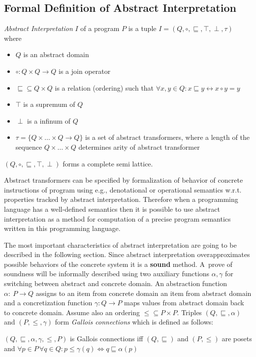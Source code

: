 \documentclass[a4paper, 12pt]{article}
\newcommand{\aord}[0]{\sqsubseteq}
\newcommand{\cord}[0]{\leq}
\newcommand{\adom}[0]{Q}
\newcommand{\aitem}[0]{q}
\newcommand{\asup}[0]{\top}
\newcommand{\ainf}[0]{\perp}
\newcommand{\cdom}[0]{P}
\newcommand{\citem}[0]{p}
\newcommand{\atrans}[0]{\tau}
\newcommand{\ajoin}[0]{\circ}
\newcommand{\afun}[0]{\alpha}
\newcommand{\cfun}[0]{\gamma}
\begin{document}
\subsection{Formal Definition of Abstract Interpretation}
\emph{Abstract Interpretation} $I$ of a program $P$ is a tuple
$I=(\adom, \ajoin, \aord, \asup, \ainf, \atrans)$ where
\begin{itemize}
	\item $\adom$ is an abstract domain
	\item $\ajoin: \adom \times \adom \rightarrow \adom$ is a join operator
	\item $\aord \subseteq \adom \times \adom$ is a relation (ordering) such that $\forall x,y \in \adom: x \aord y \leftrightarrow x \ajoin y = y$
	\item $\asup$ is a supremum of $\adom$
	\item $\ainf$ is a infinum of $\adom$
	\item $\atrans = \{\adom \times \ldots \times \adom \rightarrow \adom\}$ is a set of abstract transformers, where a length of
		the sequence $\adom \times \ldots \times \adom$ determines arity of abstract transformer
\end{itemize}


$(\adom, \ajoin, \aord, \top, \perp)$ forms a complete semi lattice.

Abstract transformers can be specified by formalization of behavior of concrete instructions
of program using e.g., denotational or operational semantics w.r.t. properties tracked
by abstract interpretation.
Therefore when a programming language has a well-defined semantics then
it is possible to use abstract interpretation as a method for computation
of a precise program semantics written in this programming language.

The most important characteristics of abstract interpretation
are going to be described in the following section.
Since abstract interpretation overapproximates possible behaviors of
the concrete system it is a \textbf{sound} method.
A~prove of soundness will be informally described using
two auxiliary functions $\afun, \cfun$ for switching between abstract and concrete domain.
An abstraction function $\afun:~\cdom \rightarrow \adom$ assigns to an item from
concrete domain an item from abstract domain and a concretization function
$\cfun: \adom \rightarrow \cdom$ maps values from abstract domain back to concrete domain.
Assume also an ordering $\cord \subseteq \cdom \times \cdom$.
Triples $(\adom, \aord, \afun)$ and $(\cdom, \cord, \cfun)$ form
\emph{Gallois connections} \cite{popl77} which is defined as follows:
\begin{center}
	$(\adom, \aord, \afun, \cfun, \cord, \cdom)$ is Gallois connections iff
	$(\adom, \aord)$ and $(\cdom, \cord)$ are posets and
	$\forall \citem \in \cdom \, \forall \aitem \in \adom: \citem \cord \cfun(\aitem)
	\Leftrightarrow \aitem \aord \afun(\citem)$
\end{center}
\end{document}
